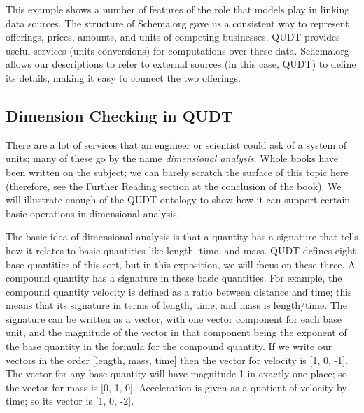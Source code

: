 This example shows a number of features of the role that models play in
linking data sources. The structure of Schema.org gave
us a consistent way to represent offerings, prices, amounts, and units
of competing businesses. QUDT provides useful services (units
conversions) for computations over these data. Schema.org allows our 
descriptions to refer to external sources (in this case, QUDT) to define
its details, making it easy to connect the two offerings. 

\subsection{Dimension Checking in QUDT}

There are a lot of services that an engineer or scientist could ask of a
system of units; many of these go by the name \emph{dimensional analysis}.
Whole books have been written on the subject; we can barely scratch the
surface of this topic here (therefore, see the Further Reading section
at the conclusion of the book). We will illustrate enough of the QUDT
ontology to show how it can support certain basic operations in
dimensional analysis.

The basic idea of dimensional analysis is that a quantity has a
signature that tells how it relates to
basic quantities like length, time, and mass. QUDT defines eight base
quantities of this sort, but in this exposition, we will focus on these
three. A compound quantity has a signature in these basic quantities.
For example, the compound quantity velocity is defined as a ratio
between distance and time; this means that its signature in terms of
length, time, and mass is length/time. The signature can be written as a
vector, with one vector component for each base unit, and the magnitude
of the vector in that component being the exponent of the base quantity
in the formula for the compound quantity. If we write our vectors in the
order {[}length, mass, time{]} then the vector for velocity is {[}1, 0,
-1{]}. The vector for any base quantity will have magnitude 1 in exactly
one place; so the vector for mass is {[}0, 1, 0{]}. Acceleration is
given as a quotient of velocity by time; so its vector is {[}1, 0,
-2{]}.

